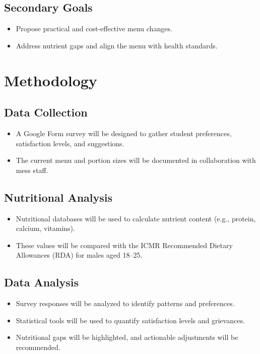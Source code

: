 \documentclass[12pt,a4paper]{article}
\begin{document}
\subsection{Secondary Goals}
\begin{itemize}
    \item Propose practical and cost-effective menu changes.
    \item Address nutrient gaps and align the menu with health standards.
\end{itemize}

\section{Methodology}
\subsection{Data Collection}
\begin{itemize}
    \item A Google Form survey will be designed to gather student preferences, satisfaction levels, and suggestions.
    \item The current menu and portion sizes will be documented in collaboration with mess staff.
\end{itemize}

\subsection{Nutritional Analysis}
\begin{itemize}
    \item Nutritional databases will be used to calculate nutrient content (e.g., protein, calcium, vitamins).
    \item These values will be compared with the ICMR Recommended Dietary Allowances (RDA) for males aged 18--25.
\end{itemize}

\subsection{Data Analysis}
\begin{itemize}
    \item Survey responses will be analyzed to identify patterns and preferences.
    \item Statistical tools will be used to quantify satisfaction levels and grievances.
    \item Nutritional gaps will be highlighted, and actionable adjustments will be recommended.
\end{itemize}
\end{document}
